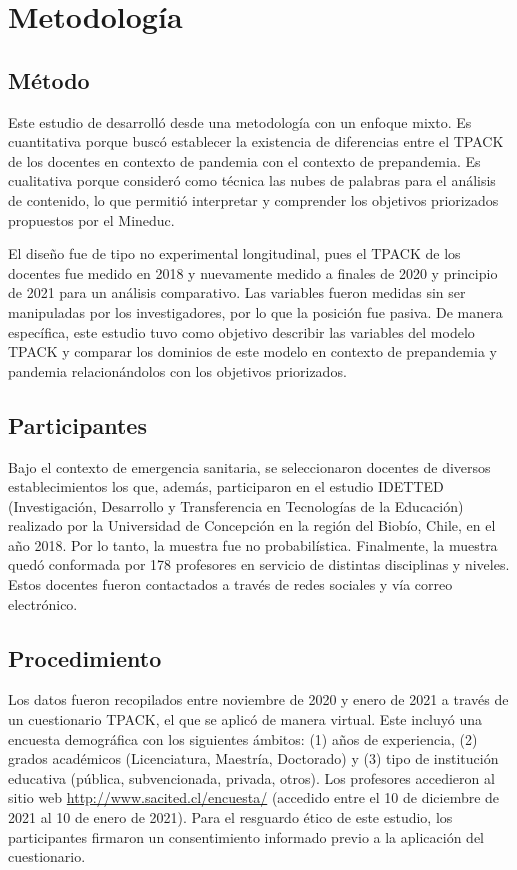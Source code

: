 \documentclass[spanish]{textolivre}
\begin{document}
\section{Metodología}\label{sec-formato}
\subsection{Método}
Este estudio de desarrolló desde una metodología con un enfoque mixto. Es cuantitativa porque buscó establecer la existencia de diferencias entre el TPACK de los docentes en contexto de pandemia con el contexto de prepandemia. Es cualitativa porque consideró como técnica las nubes de palabras para el análisis de contenido, lo que permitió interpretar y comprender los objetivos priorizados propuestos por el Mineduc.

El diseño fue de tipo no experimental longitudinal, pues el TPACK de los docentes fue medido en 2018 y nuevamente medido a finales de 2020 y principio de 2021 para un análisis comparativo. Las variables fueron medidas sin ser manipuladas por los investigadores, por lo que la posición fue pasiva. De manera específica, este estudio tuvo como objetivo describir las variables del modelo TPACK y comparar los dominios de este modelo en contexto de prepandemia y pandemia relacionándolos con los objetivos priorizados.

\subsection{Participantes}\label{sec-modelo}
Bajo el contexto de emergencia sanitaria, se seleccionaron docentes de diversos establecimientos los que, además, participaron en el estudio IDETTED (Investigación, Desarrollo y Transferencia en Tecnologías de la Educación) realizado por la Universidad de Concepción en la región del Biobío, Chile, en el año 2018. Por lo tanto, la muestra fue no probabilística. Finalmente, la muestra quedó conformada por 178 profesores en servicio de distintas disciplinas y niveles. Estos docentes fueron contactados a través de redes sociales y vía correo electrónico.

\subsection{Procedimiento}\label{sec-organizacao}
Los datos fueron recopilados entre noviembre de 2020 y enero de 2021 a través de un cuestionario TPACK, el que se aplicó de manera virtual. Este incluyó una encuesta demográfica con los siguientes ámbitos: (1) años de experiencia, (2) grados académicos (Licenciatura, Maestría, Doctorado) y (3) tipo de institución educativa (pública, subvencionada, privada, otros). Los profesores accedieron al sitio web \url{http://www.sacited.cl/encuesta/} (accedido entre el 10 de diciembre de 2021 al 10 de enero de 2021). Para el resguardo ético de este estudio, los participantes firmaron un consentimiento informado previo a la aplicación del cuestionario.
\end{document}
